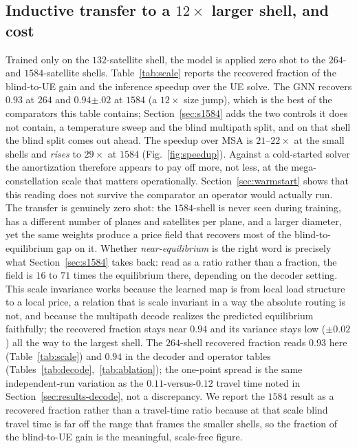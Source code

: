 \documentclass[journal]{IEEEtran}
\begin{document}
\subsection{Inductive transfer to a $12\times$ larger shell, and cost}\label{sec:c2}
Trained only on the $132$-satellite shell, the model is applied zero shot to the
$264$- and $1584$-satellite shells. Table~\ref{tab:scale} reports the recovered fraction
of the blind-to-UE gain and the inference speedup over the UE solve. The GNN recovers
$0.93$ at $264$ and $0.94{\scriptstyle\pm.02}$ at $1584$ (a $12\times$ size jump), which is the
best of the comparators this table contains; Section~\ref{sec:s1584} adds the two controls it does
not contain, a temperature sweep and the blind multipath split, and on that shell the blind split
comes out ahead. The speedup over MSA is $21$--$22\times$ at the small
shells and \emph{rises} to $29\times$ at $1584$ (Fig.~\ref{fig:speedup}). Against a
cold-started solver the amortization therefore appears to pay off more, not less, at the
mega-constellation scale that matters operationally. Section~\ref{sec:warmstart} shows that
this reading does not survive the comparator an operator would actually run. The transfer
is genuinely zero shot: the $1584$-shell is never seen during training, has a different
number of planes and satellites per plane, and a larger diameter, yet the same weights
produce a price field that recovers most of the blind-to-equilibrium gap on it. Whether
\emph{near-equilibrium} is the right word is precisely what Section~\ref{sec:s1584} takes back:
read as a ratio rather than a fraction, the field is $16$ to $71$ times the equilibrium there,
depending on the decoder setting. This scale invariance works because the learned map is from
local load structure to a local price, a relation that is scale invariant in a way the
absolute routing is not, and because the multipath decode realizes the predicted
equilibrium faithfully; the recovered fraction stays near $0.94$ and its variance stays
low ($\pm 0.02$) all the way to the largest shell. The $264$-shell recovered fraction reads
$0.93$ here (Table~\ref{tab:scale}) and $0.94$ in the decoder and operator tables
(Tables~\ref{tab:decode},~\ref{tab:ablation}); the one-point spread is the same
independent-run variation as the $0.11$-versus-$0.12$ travel time noted in
Section~\ref{sec:results-decode}, not a discrepancy. We report the $1584$ result as a
recovered fraction rather than a travel-time ratio because at that scale blind travel time
is far off the range that frames the smaller shells, so the fraction of the blind-to-UE
gain is the meaningful, scale-free figure.
\end{document}
